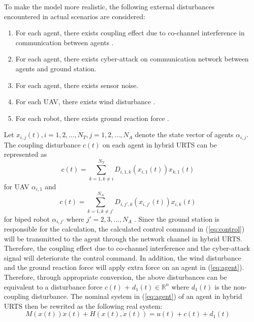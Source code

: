 \documentclass{ieeeaccess}
\begin{document}
To make the model more realistic, the following external disturbances encountered in actual scenarios are considered:
\begin{enumerate}
    \item For each agent, there exists coupling effect due to co-channel interference in communication between agents \cite{9834947}.
    \item For each agent, there exists cyber-attack on communication network between agents and ground station.
    \item For each agent, there exists sensor noise.
    \item For each UAV, there exists wind disturbance \cite{9075385}.
    \item For each robot, there exists ground reaction force \cite{chen2013human}. 
\end{enumerate}
Let $x_{i,j}(t), i=1,2,\dots,N_T, j=1,2,\dots,N_A$ denote the state vector of agents $\alpha_{i,j}$. The coupling disturbance $c(t)$ on each agent in hybrid URTS can be represented as \begin{equation} \label{eq:UAV couple}
    c(t) = \sum_{k = 1, k \neq i}^{N_T}D_{i, 1, k}(x_{i, 1}(t))x_{k, 1}(t)
\end{equation} for UAV $\alpha_{i, 1}$ and \begin{equation} \label{eq:robot couple}
    c(t) = \sum_{k = 1, k \neq j'}^{N_A}D_{i, j', k}(x_{i, j'}(t))x_{i, k}(t)
\end{equation} for biped robot $\alpha_{i, j'}$ where $j'=2,3,...,N_A$ \cite{9834947}. Since the ground station is responsible for the calculation, the calculated control command in (\ref{eq:control}) will be transmitted to the agent through the network channel in hybrid URTS. Therefore, the coupling effect due to co-channel interference and the cyber-attack signal will deteriorate the control command. In addition, the wind disturbance and the ground reaction force will apply extra force on an agent in (\ref{eq:agent}). Therefore, through appropriate conversion, the above disturbances can be equivalent to a disturbance force $c(t)$ + $d_1(t)\in\mathbb{R}^n$ where $d_1(t)$ is the non-coupling disturbance. The nominal system in (\ref{eq:agent}) of an agent in hybrid URTS then be rewrited as the following real system:
\begin{equation} \label{eq:agent d1} 
    M(x(t))\ddot{x}(t) + H(x(t),\dot{x}(t)) = u(t) + c(t) + d_1(t)
\end{equation}
\end{document}
